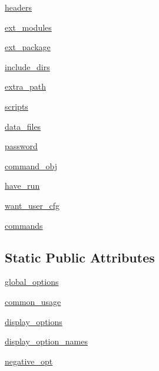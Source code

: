 \begin{DoxyCompactItemize}
\item 
\hyperlink{classsetuptools_1_1__distutils_1_1dist_1_1Distribution_a8e2ad2dcc2b495af549a831fc1d8e737}{headers}
\item 
\hyperlink{classsetuptools_1_1__distutils_1_1dist_1_1Distribution_a1ce1205232ad1b2dfcc5c279c5e8e224}{ext\+\_\+modules}
\item 
\hyperlink{classsetuptools_1_1__distutils_1_1dist_1_1Distribution_ad8159eeaf5f58e6037842adbaae6e828}{ext\+\_\+package}
\item 
\hyperlink{classsetuptools_1_1__distutils_1_1dist_1_1Distribution_a3d9a4052bfed3930c9fac005989cfe7d}{include\+\_\+dirs}
\item 
\hyperlink{classsetuptools_1_1__distutils_1_1dist_1_1Distribution_a4b3c2509f2c00276c9c4b605d791b03a}{extra\+\_\+path}
\item 
\hyperlink{classsetuptools_1_1__distutils_1_1dist_1_1Distribution_ae701050e3ff4c9938d61381a2a503361}{scripts}
\item 
\hyperlink{classsetuptools_1_1__distutils_1_1dist_1_1Distribution_aff149089da1980180353f26ed60bc773}{data\+\_\+files}
\item 
\hyperlink{classsetuptools_1_1__distutils_1_1dist_1_1Distribution_a53c4dd16ccff91d6f0156df503e34b1a}{password}
\item 
\hyperlink{classsetuptools_1_1__distutils_1_1dist_1_1Distribution_a108fe27bd556426489bee7dcbb3b8692}{command\+\_\+obj}
\item 
\hyperlink{classsetuptools_1_1__distutils_1_1dist_1_1Distribution_ad62b73e275686c103c24040560947c19}{have\+\_\+run}
\item 
\hyperlink{classsetuptools_1_1__distutils_1_1dist_1_1Distribution_a42417d49c1a71aa7a28657b8a1d15c16}{want\+\_\+user\+\_\+cfg}
\item 
\hyperlink{classsetuptools_1_1__distutils_1_1dist_1_1Distribution_ad050adfe72c00b4c0069922348aac9c5}{commands}
\end{DoxyCompactItemize}
\subsection*{Static Public Attributes}
\begin{DoxyCompactItemize}
\item 
\hyperlink{classsetuptools_1_1__distutils_1_1dist_1_1Distribution_aaba2c1471862c98007052b664d1d88ee}{global\+\_\+options}
\item 
\hyperlink{classsetuptools_1_1__distutils_1_1dist_1_1Distribution_ab54b291d9f2f49869d3e4218fc0413bf}{common\+\_\+usage}
\item 
\hyperlink{classsetuptools_1_1__distutils_1_1dist_1_1Distribution_a5a8edee189c89bd203d099966f29da6a}{display\+\_\+options}
\item 
\hyperlink{classsetuptools_1_1__distutils_1_1dist_1_1Distribution_a62647f361e6b3e8b7ef57c9e038c0212}{display\+\_\+option\+\_\+names}
\item 
\hyperlink{classsetuptools_1_1__distutils_1_1dist_1_1Distribution_acf315193aef8c899149fece676d8c321}{negative\+\_\+opt}
\end{DoxyCompactItemize}


